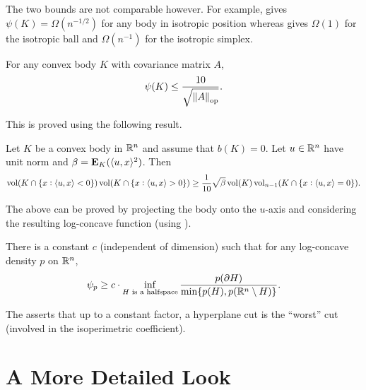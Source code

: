 \documentclass{article}
\begin{document}
		The two bounds  are not comparable however. For example,  gives $\psi(K)=\Omega(n^{-1/2})$ for any body in isotropic position whereas  gives $\Omega(1)$ for the isotropic ball and $\Omega(n^{-1})$ for the isotropic simplex.\\


		\begin{theorem}
			\label{kls conj hyperplane}
			For any convex body $K$ with covariance matrix $A$,
			\[ \psi(K) \leq \frac{10}{\sqrt{\left\lVert A\right\rVert_{\text{op}}}}. \]
		\end{theorem}

		This is proved using the following result.

		\begin{theorem}
			Let $K$ be a convex body in $\mathbb{R}^n$ and assume that $b(K)=0$. Let $u\in\mathbb{R}^n$ have unit norm and $\beta=\textbf{E}_K(\langle u,x\rangle^2)$. Then
			\[ \operatorname{vol}(K \cap \{x : \langle u,x\rangle < 0\}) \operatorname{vol}(K \cap \{x : \langle u,x\rangle > 0\}) \geq \frac{1}{10}\sqrt{\beta}\operatorname{vol}(K)\operatorname{vol}_{n-1}(K \cap \{x : \langle u,x\rangle = 0\}). \]
		\end{theorem}

		The above can be proved by projecting the body onto the $u$-axis and considering the resulting log-concave function (using ).

		\begin{fcon}
			\label{con: kls conjecture}
			There is a constant $c$ (independent of dimension) such that for any log-concave density $p$ on $\mathbb{R}^n$,
			\[ \psi_p \geq c \cdot \inf_{H\text{ is a halfspace}} \frac{p(\partial H)}{\min\{p(H),p(\mathbb{R}^n\setminus H)\}}. \]
		\end{fcon}

		The  asserts that up to a constant factor, a hyperplane cut is the ``worst'' cut (involved in the isoperimetric coefficient).


\clearpage

\section{A More Detailed Look}
\end{document}
